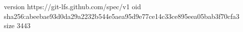 version https://git-lfs.github.com/spec/v1
oid sha256:abeebae93d0da29a2232b544e5aea95d9e77ce14c33ce895eea05bab3f70cfa3
size 3443
